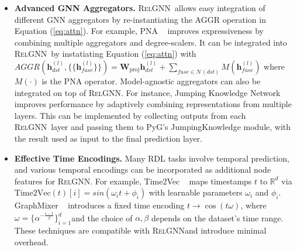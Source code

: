 \documentclass{article}
\newcommand{\method}{\textsc{RelGNN}}
\theoremstyle{plain}
\theoremstyle{definition}
\theoremstyle{remark}
\begin{document}
\begin{itemize}
    \item \textbf{Advanced GNN Aggregators.} \method~allows easy integration of different GNN aggregators by re-instantiating the AGGR operation in Equation (\ref{eq:attn}). For example, PNA ~\citep{corso2020principal} improves expressiveness by combining multiple aggregators and degree-scalers. It can be integrated into \method~by instatiating Equation (\ref{eq:attn}) with $AGGR(\mathbf{h}_{dst}^{(l)},\{\{\mathbf{h}_{fuse}^{(l)}\}\})=\mathbf{W}_{\text{proj}}\mathbf{h}_{dst}^{(l)}+\sum_{fuse\in \mathcal{N}(dst)} M(\mathbf{h}_{fuse}^{(l)})$ where $M(\cdot)$ is the PNA operator. Model-agnostic aggregators can also be integrated on top of \method. For instance, Jumping Knowledge Network ~\citep{xu2018representation} improves performance by adaptively combining representations from multiple layers. This can be implemented by collecting outputs from each \method~layer and passing them to PyG’s JumpingKnowledge module, with the result used as input to the final prediction layer.
    \item \textbf{Effective Time Encodings.} Many RDL tasks involve temporal prediction, and various temporal encodings can be incorporated as additional node features for \method. For example, Time2Vec ~\citep{kazemi2019time2vec} maps timestamps $t$ to $\mathbb{R}^d$ via $\text{Time2Vec}(t)[i]=sin(\omega_it+\phi_i)$ with learnable parameters  $\omega_i$ and $\phi_i$. GraphMixer ~\citep{congwe} introduces a fixed time encoding $t \rightarrow \cos(t \omega)$, where $\omega=\{\alpha^{-\frac{i-1}{\beta}}\}_{i=1}^d$and the choice of $\alpha,\beta$ depends on the dataset's time range. These techniques are compatible with \method and introduce minimal overhead.
\end{itemize}



\end{document}
